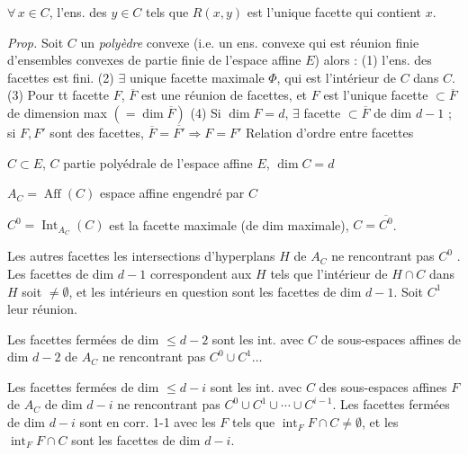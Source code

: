 \documentclass[11pt,a4paper]{article}
\begin{document}
$\forall\, x \in C$, l'ens. des $y \in C$ tels que $R(x,y)$ est
l'unique facette qui contient $x$.

\emph{Prop.} \struck{\ill{}} Soit $C$ un \emph{polyèdre} convexe (i.e. un ens.
convexe qui est réunion finie d'ensembles \struck{\ill{}} convexes de partie
finie de l'espace affine $E$) alors : (1) l'ens. des facettes est
fini. (2) $\exists$ unique facette maximale $\Phi$, qui est
l'intérieur de $C$ dans   $C$.
(3) Pour tt facette $F$, $\overline{F}$ est une réunion de
facettes, et $F$ est l'unique facette $\subset \overline{F}$ de dimension max
$(= \dim \overline{F})$  (4) Si $\dim F = d$,
$\exists$ facette $\subset \overline{F}$ de dim $d-1$ ; si $F, F'$ sont des
facettes, $\overline{F} = \overline{F'} \Rightarrow F = F'$
Relation d'ordre entre facettes


$C \subset E$, $C$ partie polyédrale de l'espace affine $E$,
$\dim C = d$

$A_C = \operatorname{Aff}(C)$ espace affine engendré par $C$

$C^0 = \operatorname{Int}_{A_C}(C)$ est la facette maximale (de dim maximale),
$C = \overline{C^0}$.

Les autres facettes   les intersections  d'hyperplans $H$ de $A_C$ ne rencontrant pas $C^0$ \struck{\ill{}}.
Les facettes   de dim $d-1$ correspondent
 aux $H$ tels que l'intérieur de $H \cap C$ dans $H$ soit
$\neq \emptyset$, et les intérieurs en question sont les facettes
 de dim $d-1$. Soit $C^1$ leur réunion.

Les facettes fermées de dim $\leq d-2$ sont les int. avec $C$ de
sous-espaces affines de dim $d-2$ de $A_C$ ne rencontrant pas
$C^0 \cup C^1 \ldots$

Les facettes fermées de dim $\leq d-i$ sont les int.  avec
$C$ des sous-espaces affines $F$ de $A_C$ de dim $d-i$ 
\struck{\ill{}} ne rencontrant pas $C^0 \cup C^1 \cup \cdots \cup C^{i-1}$.
Les facettes fermées de dim $d-i$ sont en corr. 1-1 avec les $F$ tels que
$\operatorname{int}_F F \cap C \neq \emptyset$, et les
$\operatorname{int}_F F \cap C$ sont les facettes de dim $d-i$.
\end{document}
